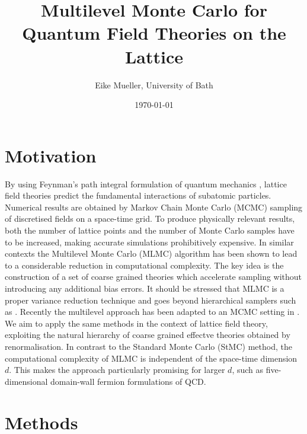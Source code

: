 \documentclass[11pt]{article}
\author{Eike Mueller, University of Bath}
\date{\today}
\title{Multilevel Monte Carlo for Quantum Field Theories on the Lattice}
\begin{document}
\maketitle
\section{Motivation}
By using Feynman's path integral formulation of quantum mechanics \cite{Feynman2010}, lattice field theories predict the fundamental interactions of subatomic particles. Numerical results are obtained by Markov Chain Monte Carlo (MCMC) sampling of discretised fields on a space-time grid. To produce physically relevant results, both the number of lattice points and the number of Monte Carlo samples have to be increased, making accurate simulations prohibitively expensive. In similar contexts the Multilevel Monte Carlo (MLMC) algorithm \cite{Giles2015} has been shown to lead to a considerable reduction in computational complexity. The key idea is the construction of a set of coarse grained theories which accelerate sampling without introducing any additional bias errors. It should be stressed that MLMC is a proper variance reduction technique and goes beyond hierarchical samplers such as \cite{Faas1986}.
Recently the multilevel approach has been adapted to an MCMC setting in \cite{Dodwell2015}. We aim to apply the same methods in the context of lattice field theory, exploiting the natural hierarchy of coarse grained effectve theories obtained by renormalisation. In contrast to the Standard Monte Carlo (StMC) method, the computational complexity of MLMC is independent of the space-time dimension $d$. This makes the approach particularly promising for larger $d$, such as five-dimensional domain-wall fermion formulations \cite{Kaplan1992} of QCD. 
\section{Methods}

\end{document}
